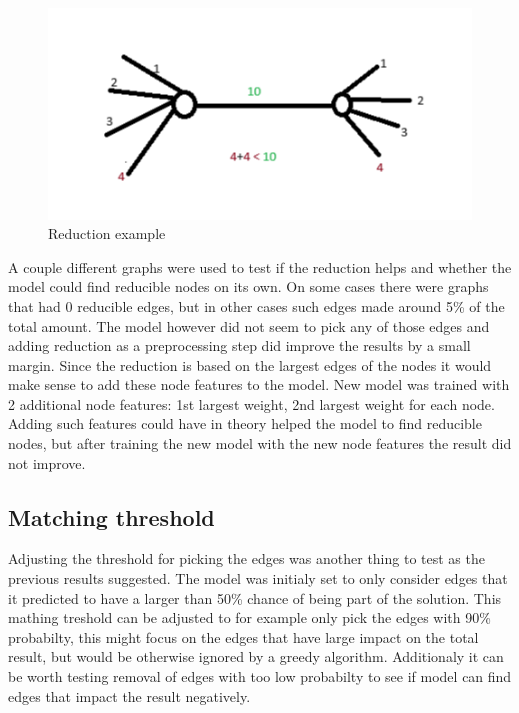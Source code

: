 \begin{figure}[H]
    \centering
    \includegraphics[scale=1.0]{figures/ReductionExample}
    \caption{Reduction example}
    \label{Reduction example}
\end{figure}

A couple different graphs were used to test if the reduction helps and whether the model could find reducible nodes on its own. On some cases there were graphs that had 0 reducible edges, but in other cases such edges made around 5\% of the total amount. The model however did not seem to pick any of those edges and adding reduction as a preprocessing step did improve the results by a small margin. Since the reduction is based on the largest edges of the nodes it would make sense to add these node features to the model. 
New model was trained with 2 additional node features: 1st largest weight, 2nd largest weight for each node.
Adding such features could have in theory helped the model to find reducible nodes, but after training the new model with the new node features the result did not improve.

\subsection{Matching threshold}

Adjusting the threshold for picking the edges was another thing to test as the previous results suggested. The model was initialy set to only consider edges that it predicted to have a larger than 50\% chance of being part of the solution. This mathing treshold can be adjusted to for example only pick the edges with 90\% probabilty, this might focus on the edges that have large impact on the total result, but would be otherwise ignored by a greedy algorithm. Additionaly it can be worth testing removal of edges with too low probabilty to see if model can find edges that impact the result negatively.

